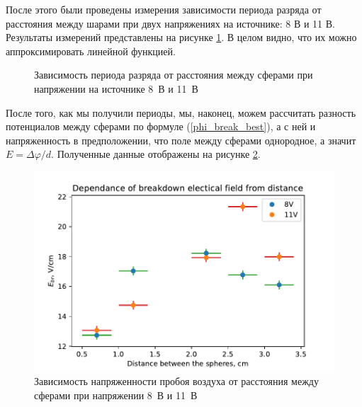 \documentclass[a4paper, 12pt]{article}
\renewcommand{\phi}{\varphi} %
\begin{document}
После этого были проведены измерения зависимости периода разряда от расстояния между шарами при двух напряжениях на источнике: 8 В и 11 В. Результаты измерений представлены на рисунке \ref{fig:TV}. В целом видно, что их можно аппроксимировать линейной функцией.

\begin{figure}[ht!]
	\centering
	\caption{Зависимость периода разряда от расстояния между сферами при напряжении на источнике 8~В  и 11~В }
	\label{fig:TV}
\end{figure}

После того, как мы получили периоды, мы, наконец, можем рассчитать разность потенциалов между сферами по формуле (\ref{phi_break_best}), а с ней и напряженность в предположении, что поле между сферами однородное, а значит $E = \Delta \phi / d$. Полученные данные отображены на рисунке \ref{fig:E}.

\begin{figure}[h]
	\centering
	\includegraphics[width=0.8\linewidth]{E}
	\caption{Зависимость напряженности пробоя воздуха от расстояния между сферами при напряжении 8~В и 11~В}
	\label{fig:E}
\end{figure}
\end{document}
